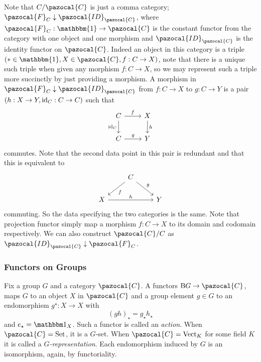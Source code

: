 \begin{remark}
    Note that $C/\pazocal{C}$ is just a comma category; $\pazocal{F}_C\downarrow \pazocal{ID}_\pazocal{C}$, where $\pazocal{F}_C: \mathbbm{1} \rightarrow \pazocal{C}$ is the constant functor from the category with one object and one morphism and $\pazocal{ID}_\pazocal{C}$ is the identity functor on $\pazocal{C}$. Indeed an object in this category is a triple $(\ast\in \mathbbm{1},X\in \pazocal{C},f: C\rightarrow X)$, note that there is a unique such triple when given any morphism $f: C\rightarrow X$, so we may represent such a triple more succinctly by just providing a morphism. A morphism in $\pazocal{F}_C\downarrow \pazocal{ID}_\pazocal{C}$ from $f:C\rightarrow X$ to $g: C\rightarrow Y$ is a pair $(h:X\rightarrow Y, \mathrm{id}_C: C\rightarrow C)$ such that 
    $$
        \begin{tikzcd}
            C \arrow[r, "f"]\arrow[d,"\id_C",swap] & X\arrow[d, "h"]\\
            C \arrow[r, "g"] & Y  
        \end{tikzcd}
    $$
    commutes. Note that the second data point in this pair is redundant and that this is equivalent to 
    $$
        \begin{tikzcd}
            & C\arrow[ld, "f"]\arrow[rd, "g"]\\
            X \arrow{rr}{h} & & Y 
        \end{tikzcd}
    $$
    commuting. So the data specifying the two categories is the same. Note that projection functor simply map a morphism $f: C \rightarrow X$ to its domain and codomain respectively. We can also construct $\pazocal{C}/C$ as $\pazocal{ID}_\pazocal{C}\downarrow \pazocal{F}_C$.  
\end{remark} 
\subsubsection{Functors on Groups}
Fix a group $G$ and a category $\pazocal{C}$. A functors $\mathrm{B}G \rightarrow \pazocal{C}$, maps $G$ to an object $X$ in $\pazocal{C}$ and a group element $g\in G$ to an endomorphism $g^\star : X\rightarrow X$ with 
$$(gh)_\star = g_\star h_\star$$
and $e_\star = \fone_X$. Such a functor is called an \emph{action}. When $\pazocal{C} = \mathrm{Set}$, it is a $G$-set. When $\pazocal{C} = \mathrm{Vect}_K$ for some field $K$ it is called a \emph{$G$-representation}. Each endomorphism induced by $G$ is an isomorphism, again, by functoriality. 
